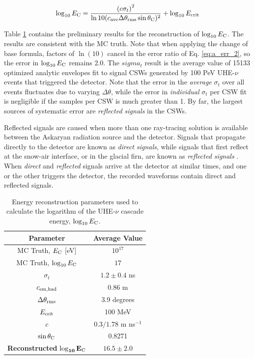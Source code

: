 \documentclass[amsmath,amssymb,aps,prd,10pt,twocolumn,showkeys]{revtex4}
\begin{document}
\begin{itemize}
\begin{equation}
\log_{10} E_{\rm C} = \frac{\left( c\sigma_t \right)^2}{\ln 10(c_{\rm ave} \Delta\theta_{\rm rms}\sin\theta_{\rm C})^2} + \log_{10} E_{\rm crit} \label{eq:lnLambda_2}
\end{equation}

Table \ref{tab:2} contains the preliminary results for the reconstruction of $\log_{10}E_{\rm C}$.  The results are consistent with the MC truth.  Note that when applying the change of base formula, factors of $\ln(10)$ cancel in the error ratio of Eq. \ref{eq:a_err_2}, so the error in $\log_{10} E_{\rm C}$ remains $2.0$.  The $sigma_t$ result is the average value of 15133 optimized analytic envelopes fit to signal CSWs generated by 100 PeV UHE-$\nu$ events that triggered the detector.  Note that the error in the \textit{average} $\sigma_t$ over all events fluctuates due to varying $\Delta\theta$, while the error in \textit{individual} $\sigma_t$ per CSW fit is negligible if the samples per CSW is much greater than 1.  By far, the largest sources of systematic error are \textit{reflected signals} in the CSWs.

Reflected signals are caused when more than one ray-tracing solution is available between the Askaryan radiation source and the detector.  Signals that propagate directly to the detector are known as \textit{direct signals}, while signals that first reflect at the snow-air interface, or in the glacial firn, are known as \textit{reflected signals} \cite{}.  When \textit{direct} and \textit{reflected} signals arrive at the detector at similar times, and one or the other triggers the detector, the recorded waveforms contain direct and reflected signals.

\begin{table}
\centering
\begin{tabular}{| c | c |}
\hline
\textbf{Parameter} & \textbf{Average Value} \\ \hline
MC Truth, $E_{\rm C}$ [eV] & $10^{17}$ \\
MC Truth, $\log_{10}E_{\rm C}$ & $17$ \\
$\sigma_t$ & $1.2 \pm 0.4$ ns \\
$c_{\rm em,had}$ & 0.86 m \\
$\Delta\theta_{\rm rms}$ & 3.9 degrees \\
$E_{\rm crit}$ & 100 MeV \\
$c$ & $0.3/1.78$ m ns$^{-1}$ \\
$\sin\theta_{\rm C}$ & 0.8271 \\ \hline
\textbf{Reconstructed} $\mathbf{\log_{10}E_{\rm C}}$ & $16.5\pm 2.0$ \\
\hline
\end{tabular}
\caption{\label{tab:2} Energy reconstruction parameters used to calculate the logarithm of the UHE-$\nu$ cascade energy, $\log_{10}E_{\rm C}$.}
\end{table}

\end{itemize}
\end{document}
